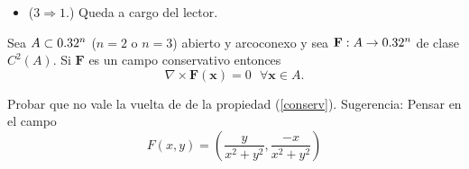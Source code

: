 \begin{theorem}
\begin{itemize}
\begin{figure}[H]
\begin{center}
\begin{tikzpicture}[scale=2, >=stealth]
            \end{tikzpicture}
            \caption{Curvas $C_1$ y $C_2$.}
        \end{center}
    \end{figure}
   Es decir,  $C^{+}=C_1^{+} \cup C_2^{-}$.  Así:
    \begin{align*}
        \oint_{C^{+}} \mathbf{F}\cdot d\mathbf{s}&=\int_{C_1^{+}}\mathbf{F}\cdot d\mathbf{s}+\int_{C_2^{-}}\mathbf{F}\cdot d\mathbf{s}\\
        &=\int_{C_1^{+}}\mathbf{F}\cdot d\mathbf{s}-\int_{C_2^{+}}\mathbf{F}\cdot d\mathbf{s} =0 \ 
          \end{align*}
   \item[] ($3 \Rightarrow 1$.) Queda a cargo del lector.   
\end{itemize}
\end{theorem}


\begin{propertie}\label{conserv}  Sea $A\subset 0.32^n$   ($n=2$ o $n=3$)  abierto y arcoconexo y sea  $\mathbf{F}:A  \to 0.32^n$  de clase $C^{2}(A).$  Si $\mathbf{F}$ es  un campo conservativo entonces $$\nabla \times \mathbf{F}(\mathbf{x}) =0 \:\:\: \forall \mathbf{x} \in A.  $$  
\end{propertie}


\begin{tarea}  Probar que no vale la vuelta de de la propiedad (\ref{conserv}).  Sugerencia:  Pensar en el campo $$F(x,y) = (\dfrac{y}{x^{2}+y^{2}}, \dfrac{-x}{x^{2}+y^{2}}) $$

\end{tarea}